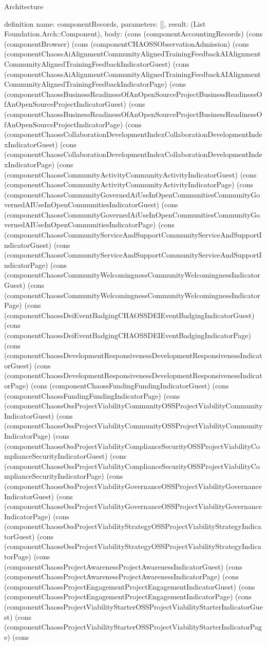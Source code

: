 \begin{lexlean}{Architecture}
\begin{semanticmodule}
definition{
  name: componentRecords,
  parameters: [],
  result: (List Foundation.Arch::Component),
  body: (cons (componentAccountingRecords) (cons (componentBrowser) (cons (componentCHAOSSObservationAdmission) (cons (componentChaossAiAlignmentCommunityAlignedTrainingFeedbackAIAlignmentCommunityAlignedTrainingFeedbackIndicatorGuest) (cons (componentChaossAiAlignmentCommunityAlignedTrainingFeedbackAIAlignmentCommunityAlignedTrainingFeedbackIndicatorPage) (cons (componentChaossBusinessReadinessOfAnOpenSourceProjectBusinessReadinessOfAnOpenSourceProjectIndicatorGuest) (cons (componentChaossBusinessReadinessOfAnOpenSourceProjectBusinessReadinessOfAnOpenSourceProjectIndicatorPage) (cons (componentChaossCollaborationDevelopmentIndexCollaborationDevelopmentIndexIndicatorGuest) (cons (componentChaossCollaborationDevelopmentIndexCollaborationDevelopmentIndexIndicatorPage) (cons (componentChaossCommunityActivityCommunityActivityIndicatorGuest) (cons (componentChaossCommunityActivityCommunityActivityIndicatorPage) (cons (componentChaossCommunityGovernedAiUseInOpenCommunitiesCommunityGovernedAIUseInOpenCommunitiesIndicatorGuest) (cons (componentChaossCommunityGovernedAiUseInOpenCommunitiesCommunityGovernedAIUseInOpenCommunitiesIndicatorPage) (cons (componentChaossCommunityServiceAndSupportCommunityServiceAndSupportIndicatorGuest) (cons (componentChaossCommunityServiceAndSupportCommunityServiceAndSupportIndicatorPage) (cons (componentChaossCommunityWelcomingnessCommunityWelcomingnessIndicatorGuest) (cons (componentChaossCommunityWelcomingnessCommunityWelcomingnessIndicatorPage) (cons (componentChaossDeiEventBadgingCHAOSSDEIEventBadgingIndicatorGuest) (cons (componentChaossDeiEventBadgingCHAOSSDEIEventBadgingIndicatorPage) (cons (componentChaossDevelopmentResponsivenessDevelopmentResponsivenessIndicatorGuest) (cons (componentChaossDevelopmentResponsivenessDevelopmentResponsivenessIndicatorPage) (cons (componentChaossFundingFundingIndicatorGuest) (cons (componentChaossFundingFundingIndicatorPage) (cons (componentChaossOssProjectViabilityCommunityOSSProjectViabilityCommunityIndicatorGuest) (cons (componentChaossOssProjectViabilityCommunityOSSProjectViabilityCommunityIndicatorPage) (cons (componentChaossOssProjectViabilityComplianceSecurityOSSProjectViabilityComplianceSecurityIndicatorGuest) (cons (componentChaossOssProjectViabilityComplianceSecurityOSSProjectViabilityComplianceSecurityIndicatorPage) (cons (componentChaossOssProjectViabilityGovernanceOSSProjectViabilityGovernanceIndicatorGuest) (cons (componentChaossOssProjectViabilityGovernanceOSSProjectViabilityGovernanceIndicatorPage) (cons (componentChaossOssProjectViabilityStrategyOSSProjectViabilityStrategyIndicatorGuest) (cons (componentChaossOssProjectViabilityStrategyOSSProjectViabilityStrategyIndicatorPage) (cons (componentChaossProjectAwarenessProjectAwarenessIndicatorGuest) (cons (componentChaossProjectAwarenessProjectAwarenessIndicatorPage) (cons (componentChaossProjectEngagementProjectEngagementIndicatorGuest) (cons (componentChaossProjectEngagementProjectEngagementIndicatorPage) (cons (componentChaossProjectViabilityStarterOSSProjectViabilityStarterIndicatorGuest) (cons (componentChaossProjectViabilityStarterOSSProjectViabilityStarterIndicatorPage) (cons }
\end{semanticmodule}
\end{lexlean}
